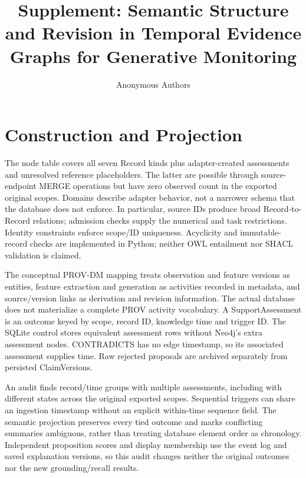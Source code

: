 \documentclass[runningheads]{llncs}
\begin{document}
\title{Supplement: Semantic Structure and Revision in Temporal Evidence Graphs for Generative Monitoring}
\author{Anonymous Authors}
\maketitle
\setcounter{section}{0}
\renewcommand{\thesection}{S\arabic{section}}
\renewcommand{\thetable}{S\arabic{table}}
\renewcommand{\thefigure}{S\arabic{figure}}

\section{Construction and Projection}



The node table covers all seven Record kinds plus adapter-created assessments and
unresolved reference placeholders. The latter are possible through source-endpoint
MERGE operations but have zero observed count in the exported original scopes.
Domains describe adapter behavior, not a narrower schema that the database does
not enforce. In particular, source IDs produce broad Record-to-Record relations;
admission checks supply the numerical and task restrictions. Identity constraints
enforce scope/ID uniqueness. Acyclicity and immutable-record checks are implemented
in Python; neither OWL entailment nor SHACL validation is claimed.

The conceptual PROV-DM mapping treats observation and feature versions as entities,
feature extraction and generation as activities recorded in metadata, and
source/version links as derivation and revision information. The actual database
does not materialize a complete PROV activity vocabulary. A SupportAssessment is
an outcome keyed by scope, record ID, knowledge time and trigger ID. The SQLite
control stores equivalent assessment rows without Neo4j's extra assessment nodes.
CONTRADICTS has no edge timestamp, so its associated assessment supplies time.
Raw rejected proposals are archived separately from persisted ClaimVersions.

An audit finds \SemAssessmentTies{} record/time groups with multiple assessments,
including \SemAssessmentConflicts{} with different states across the original
exported scopes. Sequential triggers can share an ingestion timestamp without
an explicit within-time sequence field. The semantic projection preserves every
tied outcome and marks conflicting summaries ambiguous, rather than treating
database element order as chronology. Independent proposition scores and display
membership use the event log and saved explanation versions, so this audit
changes neither the original outcomes nor the new grounding/recall results.
\end{document}
